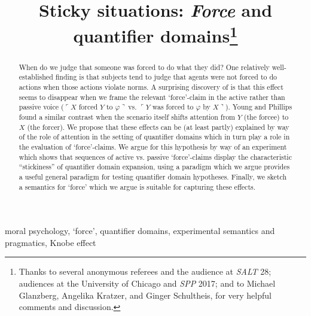 \documentclass{salt}
\title[Sticky situations: \emph{Force} and quantifier domains]{Sticky situations: \emph{Force} and quantifier domains\thanks{Thanks to several anonymous referees and the audience at \emph{SALT} 28; audiences at the University of Chicago and \emph{SPP} 2017; and to Michael Glanzberg, Angelika Kratzer, and Ginger Schultheis, for very helpful comments and discussion.}}
\author[Mandelkern and Phillips]{%
  \saltauthor{Matthew Mandelkern \\ \institute{All Souls College, Oxford}} \AND
  \saltauthor{Jonathan Phillips \\ \institute{Harvard University}}%
}
\newcommand{\ul}{$\ulcorner$}
\newcommand{\ur}{$\urcorner\ $}
\newcommand{\urn}{$\urcorner$}
\begin{document}

\maketitle

%
\setcounter{page}{1}


\begin{abstract}  
When do we judge that someone was forced to do what they did? One relatively well-established finding is that subjects tend to judge that agents were not forced to do actions when those actions violate norms. A surprising discovery of \citealt{young2011paradox} is that this effect seems to disappear when we frame the relevant `force'-claim in the active rather than passive voice (\ul $X$ forced $Y$ to $\varphi$\ur vs. \ul$Y$ was forced to $\varphi$ by $X$\urn). Young and Phillips found a similar contrast when the scenario itself shifts attention from $Y$ (the forcee) to $X$ (the forcer). We propose that these effects can be (at least partly) explained by way of the role of attention in the setting of quantifier domains which in turn play a role in the evaluation of `force'-claims. We argue for this hypothesis by way of an experiment which shows that sequences of active vs. passive `force'-claims display the characteristic ``stickiness'' of quantifier domain expansion, using a paradigm which we argue provides a useful general paradigm for testing quantifier domain hypotheses. Finally, we sketch a semantics for `force' which we argue is suitable for capturing these effects. 
\end{abstract}

\begin{keywords}
 moral psychology, `force', quantifier domains, experimental semantics and pragmatics, Knobe effect
\end{keywords}
\end{document}

